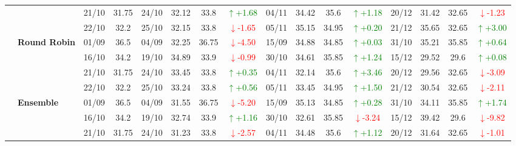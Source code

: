 \documentclass{ieeeaccess}
\begin{document}
{\begin{longtable}{llcc|cccc|cccc|cccc}
&
& 21/10 & 31.75 & 24/10 & 32.12 & 33.8 & \textcolor{green}{\(\uparrow\)+1.68} & 04/11 & 34.42 & 35.6 & \textcolor{green}{\(\uparrow\)+1.18} & 20/12 & 31.42 & 32.65 & \textcolor{red}{\(\downarrow\)-1.23} \\

&
& 22/10 & 32.2 & 25/10 & 32.15 & 33.8 & \textcolor{red}{\(\downarrow\)-1.65} & 05/11 & 35.15 & 34.95 & \textcolor{green}{\(\uparrow\)+0.20} & 21/12 & 35.65 & 32.65 & \textcolor{green}{\(\uparrow\)+3.00} \\
\cmidrule(lr){2-16}


& \textbf{Round Robin}
& 01/09 & 36.5 & 04/09 & 32.25 & 36.75 & \textcolor{red}{\(\downarrow\)-4.50} & 15/09 & 34.88 & 34.85 & \textcolor{green}{\(\uparrow\)+0.03} & 31/10 & 35.21 & 35.85 & \textcolor{green}{\(\uparrow\)+0.64} \\

&
& 16/10 & 34.2 & 19/10 & 34.89 & 33.9 & \textcolor{red}{\(\downarrow\)-0.99} & 30/10 & 34.61 & 35.85 & \textcolor{green}{\(\uparrow\)+1.24} & 15/12 & 29.52 & 29.6 & \textcolor{green}{\(\uparrow\)+0.08} \\

&
& 21/10 & 31.75 & 24/10 & 33.45 & 33.8 & \textcolor{green}{\(\uparrow\)+0.35} & 04/11 & 32.14 & 35.6 & \textcolor{green}{\(\uparrow\)+3.46} & 20/12 & 29.56 & 32.65 & \textcolor{red}{\(\downarrow\)-3.09} \\

&
& 22/10 & 32.2 & 25/10 & 33.24 & 33.8 & \textcolor{green}{\(\uparrow\)+0.56} & 05/11 & 33.45 & 34.95 & \textcolor{green}{\(\uparrow\)+1.50} & 21/12 & 30.54 & 32.65 & \textcolor{red}{\(\downarrow\)-2.11} \\
\cmidrule(lr){2-16}



& \textbf{Ensemble}
& 01/09 & 36.5 & 04/09 & 31.55 & 36.75 & \textcolor{red}{\(\downarrow\)-5.20} & 15/09 & 35.13 & 34.85 & \textcolor{green}{\(\uparrow\)+0.28} & 31/10 & 34.11 & 35.85 & \textcolor{green}{\(\uparrow\)+1.74} \\

&
& 16/10 & 34.2 & 19/10 & 32.74 & 33.9 & \textcolor{green}{\(\uparrow\)+1.16} & 30/10 & 32.61 & 35.85 & \textcolor{red}{\(\downarrow\)-3.24} & 15/12 & 39.42 & 29.6 & \textcolor{red}{\(\downarrow\)-9.82} \\

&
& 21/10 & 31.75 & 24/10 & 31.23 & 33.8 & \textcolor{red}{\(\downarrow\)-2.57} & 04/11 & 34.48 & 35.6 & \textcolor{green}{\(\uparrow\)+1.12} & 20/12 & 31.64 & 32.65 & \textcolor{red}{\(\downarrow\)-1.01} \\


\end{longtable}}
\end{document}
